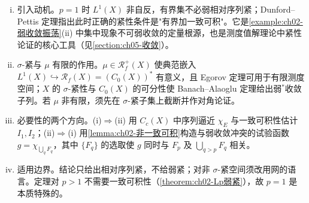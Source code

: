 \documentclass[../../main.tex]{subfiles}%
\begin{document}
\begin{remark}\label{remark:ch02-dunfordpettis}
\begin{enumerate}[(i)]
\item 引入动机。$p=1$ 时 $L^1(X)$ 非自反，有界集不必弱相对序列紧；Dunford--Pettis 定理指出此时正确的紧性条件是"有界加一致可积"。它是\cref{example:ch02-弱收敛振荡}(ii) 中集中现象不可弱收敛的定量根源，也是测度值解理论中紧性论证的核心工具（见\cref{section:ch05-收敛}）。
\item $\sigma$-紧与 $\mu$ 有限的作用。$\mu\in\mathscr R^+_f(X)$ 使典范嵌入 $L^1(X)\hookrightarrow\mathscr R_f(X)=(C_0(X))^*$ 有意义，且 Egorov 定理可用于有限测度空间；$X$ 的 $\sigma$-紧性与 $C_0(X)$ 的可分性使 Banach--Alaoglu 定理给出弱$^*$收敛子列。若 $\mu$ 非有限，须先在 $\sigma$-紧子集上截断并作对角论证。
\item 必要性的两个方向。(i)$\Rightarrow$(ii) 用 $C_c(X)$ 中序列逼近 $\chi_E$ 与一致可积性估计 $I_1,I_2$；(ii)$\Rightarrow$(i) 用\cref{lemma:ch02-非一致可积}构造与弱收敛冲突的试验函数 $g=\chi_{\bigcup_qF_q}$，其中 $\{F_q\}$ 的选取使 $g$ 同时与 $F_p$ 及 $\bigcup_{q>p}F_q$ 相关。
\item 适用边界。结论只给出相对序列紧，不给弱紧；对非 $\sigma$-紧空间须改用网的语言。定理对 $p>1$ 不需要一致可积性（\cref{theorem:ch02-Lp弱紧}），故 $p=1$ 是本质特殊的。
\end{enumerate}
\end{remark}
\end{document}

